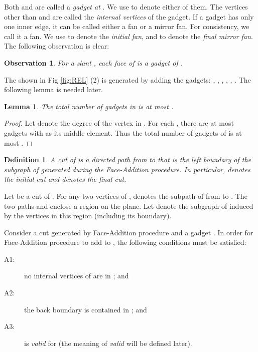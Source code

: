 \documentclass[11pt]{article}
\newtheorem{definition}[figure]{Definition}
\newtheorem{lemma}[figure]{Lemma}
\newtheorem{observation}[figure]{Observation}
\begin{document}
Both  and  are
called a {\em gadget at }. We use  to
denote either of them. The vertices other than  and 
are called the {\em internal vertices} of the gadget.
If a gadget has only one inner edge, it can be called either
a fan or a mirror fan. For consistency, we call it a fan.
We use  to denote the {\em initial fan}, and
 to denote the {\em final mirror fan}.
The following observation is clear:

\begin{observation}\label{obs:slant}
For a slant , each face  of  is a gadget of .
\end{observation}

The  shown in Fig \ref{fig:REL} (2) is generated by adding the
gadgets: , ,
, , , .
The following lemma is needed later.

\begin{lemma}\label{lemma:number}
The total number of gadgets in  is at most .
\end{lemma}

\begin{proof}
Let  denote the degree of the vertex  in . For each
, there are at most 
gadgets with  as its middle element. Thus the total number of gadgets
of  is at most
.
\end{proof}

\begin{definition}\label{def:cut}
A \emph{cut}  of  is a directed path from  to  that is
the left boundary of the subgraph of  generated during the
Face-Addition procedure. In particular,
 denotes the {\em initial cut} and
 denotes the {\em final cut}.
\end{definition}

Let  be a cut of . For any two vertices  of , 
denotes the subpath of  from  to . The two paths  and 
enclose a region on the plane. Let  denote the subgraph
of  induced by the vertices in this region (including its boundary).

Consider a cut  generated by Face-Addition procedure
and a gadget . In order for Face-Addition procedure
to add  to , the following conditions must be satisfied:
\begin{description}
\item[A1:] no internal vertices of  are in ; and
\item[A2:] the back boundary  is contained in ; and
\item[A3:]  is {\em valid} for  (the meaning of {\em valid}
will be defined later).
\end{description}
\end{document}
